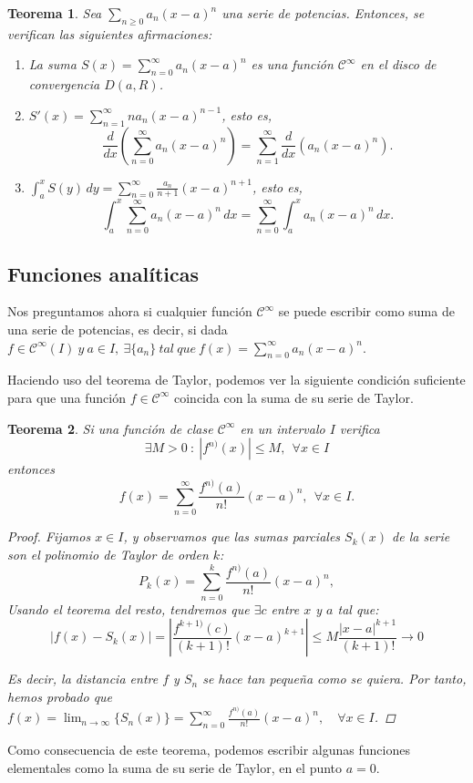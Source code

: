 \documentclass[11pt, a4paper]{article}
\theoremstyle{theorem-style}
\newtheorem{nth}{Teorema}[section]
\theoremstyle{definition-style}
\theoremstyle{remark-style}
\theoremstyle{example-style}
\newenvironment{nlist}
{\begin{enumerate}
\renewcommand\labelenumi{(\emph{\roman{enumi})}}}
{\end{enumerate}}
\begin{document}
\begin{nth}
Sea $\displaystyle\sum_{n\geq 0} a_n (x-a)^n$ una serie de potencias. Entonces, se verifican las siguientes afirmaciones:	
\begin{nlist}
	\item La suma $S(x)=\displaystyle\sum_{n= 0}^\infty a_n (x-a)^n$ es una función $\mathcal{C}^\infty$ en el disco de convergencia $D(a,R)$.
\item $S'(x)= \displaystyle\sum_{n= 1}^\infty n a_n (x-a)^{n-1}$, esto es,
\[
\displaystyle\frac{d}{dx} \left( \sum_{n= 0}^\infty a_n (x-a)^n \right) =  \sum_{n= 1}^\infty \frac{d}{dx} \left( a_n (x-a)^n \right) .
\]
\item 
$\displaystyle \int_a^x S(y)\, dy =   \sum_{n= 0}^\infty \frac{a_n}{n+1} (x-a)^{n+1}$, esto es,
\[
\int_a^x  \sum_{n= 0}^\infty a_n (x-a)^n \, dx 
=  \sum_{n= 0}^\infty \int_a^x a_n (x-a)^n \, dx.
\]
\end{nlist}

\end{nth}


\subsection{Funciones analíticas}

Nos preguntamos ahora si cualquier función $\mathcal{C}^{\infty}$ se puede escribir como suma de una serie de potencias, es decir, si dada $f \in \mathcal{C}^{\infty}(I)\ y\ a \in I, \ \exists \{a_n\}\ tal\ que\ f(x) = \sum_{n=0}^{\infty}a_n(x-a)^n$.


Haciendo uso del teorema de Taylor, podemos ver la siguiente condici\'on suficiente para que una funci\'on $f\in \mathcal{C}^\infty$ coincida con la suma de su serie de Taylor.

\begin{nth}
Si una funci\'on de clase $\mathcal{C}^\infty$ en un intervalo $I$ verifica 
\[
\exists M>0 \ : \  |f^{n)}(x)|\leq M, \ \ \forall x\in I
\]
entonces 
\[
f(x) = \sum_{n=0}^\infty \frac{f^{n)} (a)}{n!} (x-a)^n , \ \ \forall x\in I.
\]

\begin{proof}
	Fijamos $x \in I$, y observamos que las sumas parciales $S_k(x)$ de la serie son el polinomio de Taylor de orden $k$: 
\[
P_k(x) =  \sum_{n=0}^k \frac{f^{n)} (a)}{n!} (x-a)^n,
\]
Usando el teorema del resto, tendremos que $\exists c$ entre $x$ y $a$ tal que:
\[
|f(x)-S_k(x)| =\left| \frac{ f^{k+1)} (c)}{(k+1)!} (x-a)^{k+1}\right| \leq  M \frac{|x-a|^{k+1}}{(k+1)!} \to 0
\]

Es decir, la distancia entre $f$ y $S_n$ se hace tan pequeña como se quiera. Por tanto, hemos probado que $\displaystyle f(x) = \lim_{n \to \infty} \{S_n(x)\} = \sum_{n=0}^{\infty} \frac{f^{n)} (a)}{n!} (x-a)^n, \quad \forall x \in I$.
\end{proof}
\end{nth}
Como consecuencia de este teorema, podemos escribir algunas funciones elementales como la suma de su serie de Taylor, en el punto $a = 0$.
\end{document}
